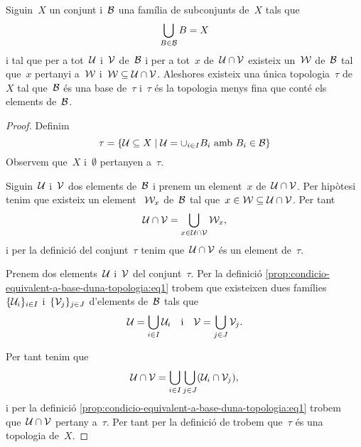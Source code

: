 \documentclass[../topologia.tex]{subfiles}
\begin{document}
    \begin{proposition}
        \label{prop:condicio-equivalent-a-base-duna-topologia}
        \label{prop:condicio-per-que-una-topologia-sigui-la-mes-fina-que-conte-una-base}
        Siguin~\(X\) un conjunt i~\(\mathcal{B}\) una família de subconjunts de~\(X\) tals que
        \[
            \bigcup_{B\in\mathcal{B}}B=X
        \]
        i tal que per a tot~\(\mathcal{U}\) i~\(\mathcal{V}\) de~\(\mathcal{B}\) i per a tot~\(x\) de~\(\mathcal{U}\cap\mathcal{V}\) existeix un~\(\mathcal{W}\) de~\(\mathcal{B}\) tal que~\(x\) pertanyi a~\(\mathcal{W}\) i~\(\mathcal{W}\subseteq\mathcal{U}\cap\mathcal{V}\).    Aleshores existeix una única topologia~\(\tau\) de~\(X\) tal que~\(\mathcal{B}\) és una base de~\(\tau\) i~\(\tau\) és la topologia menys fina que conté els elements de~\(\mathcal{B}\).
    \end{proposition}
    \begin{proof}
        Definim
        \begin{equation}
            \label{prop:condicio-equivalent-a-base-duna-topologia:eq1}
            \tau=\left\{\obert{U}\subseteq X\mid\obert{U}=\cup_{i\in I}B_{i}\text{ amb }B_{i}\in\base{B}\right\}
        \end{equation}
        Observem que~\(X\) i~\(\emptyset\) pertanyen a~\(\tau\).

        Siguin~\(\mathcal{U}\) i~\(\mathcal{V}\) dos elements de~\(\mathcal{B}\) i prenem un element~\(x\) de~\(\mathcal{U}\cap\mathcal{V}\).
        Per hipòtesi tenim que existeix un element ~\(\mathcal{W}_{x}\) de~\(\mathcal{B}\) tal que~\(x\in\mathcal{W}\subseteq\mathcal{U}\cap\mathcal{V}\).
        Per tant
        \[
            \mathcal{U}\cap\mathcal{V}=\bigcup_{x\in\mathcal{U}\cap\mathcal{V}}\mathcal{W}_{x},
        \]
        i per la definició del conjunt~\(\tau\) tenim que~\(\mathcal{U}\cap\mathcal{V}\) és un element de~\(\tau\).

        Prenem dos elements~\(\mathcal{U}\) i~\(\mathcal{V}\) del conjunt~\(\tau\).
        Per la definició \eqref{prop:condicio-equivalent-a-base-duna-topologia:eq1} trobem que existeixen dues famílies~\(\{\mathcal{U}_{i}\}_{i\in I}\) i~\(\{\mathcal{V}_{j}\}_{j\in J}\) d'elements de~\(\mathcal{B}\) tals que
        \[
            \mathcal{U}=\bigcup_{i\in I}\mathcal{U}_{i}\quad\text{i}\quad\mathcal{V}=\bigcup_{j\in J}\mathcal{V}_{j}.
        \]

        Per tant tenim que
        \[
            \mathcal{U}\cap\mathcal{V}=\bigcup_{i\in I}\bigcup_{j\in J}(\mathcal{U}_{i}\cap\mathcal{V}_{j}),
        \]
        i per la definició \eqref{prop:condicio-equivalent-a-base-duna-topologia:eq1} trobem que~\(\mathcal{U}\cap\mathcal{V}\) pertany a~\(\tau\).
        Per tant per la definició de  trobem que~\(\tau\) és una topologia de~\(X\).


\end{proof}
\end{document}
